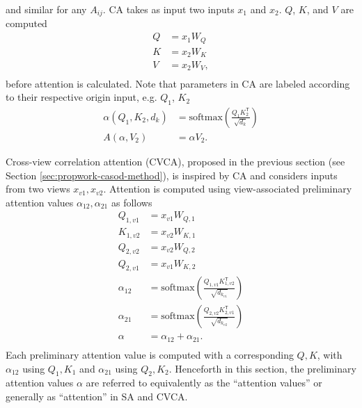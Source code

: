 and similar for any $A_{ij}$.
CA takes as input two inputs $x_1$ and $x_2$. $Q$, $K$, and $V$ are computed
\begin{equation}
\begin{aligned}
    Q & = x_1 W_Q \\
    K & = x_2 W_K \\
    V & = x_2 W_V, \\
\end{aligned}
\end{equation}
before attention is calculated. Note that parameters in CA are labeled according to their respective origin input, e.g. $Q_1$, $K_2$
\begin{equation}
\begin{aligned}
    \alpha(Q_1,K_2,d_k) & = \text{softmax} (\frac{Q_1 K_2^{\mathsf{T}}}{\sqrt{d_k}}) \\
    A(\alpha,V_2) & = \alpha V_2.
\end{aligned}
\end{equation}

Cross-view correlation attention (CVCA), proposed in the previous section (see Section \ref{sec:propwork-casod-method}), is inspired by CA and considers inputs from two views $x_{v1}, x_{v2}$. Attention is computed using view-associated preliminary attention values $\alpha_{12}, \alpha_{21}$ as follows
\begin{equation}
\begin{aligned}
    Q_{1,v1} & = x_{v1} W_{Q,1} \\
    K_{1,v2} & = x_{v2} W_{K,1} \\
    Q_{2,v2} & = x_{v2} W_{Q,2} \\
    Q_{2,v1} & = x_{v1} W_{K,2} \\
    \alpha_{12} & = \text{softmax} (\frac{Q_{1,v1} K_{1,v2}^{\mathsf{T}}}{\sqrt{d_{k_{v1}}}}) \\
    \alpha_{21} & = \text{softmax} (\frac{Q_{2,v2} K_{2,v1}^{\mathsf{T}}}{\sqrt{d_{k_{v2}}}}) \\
    \alpha & = \alpha_{12} + \alpha_{21}. \\
\end{aligned}
\end{equation}
Each preliminary attention value is computed with a corresponding $Q,K$, with $\alpha_{12}$ using $Q_1,K_1$ and $\alpha_{21}$ using $Q_2,K_2$.
Henceforth in this section, the preliminary attention values $\alpha$ are referred to equivalently as the ``attention values'' or generally as ``attention'' in SA and CVCA.

